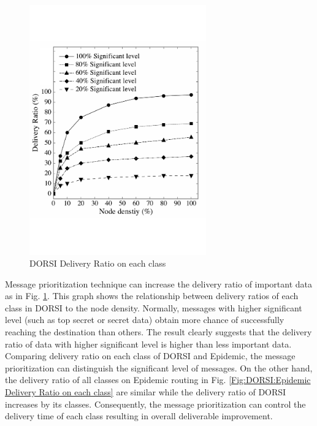 \begin{figure}[!h]
\centering
\includegraphics[width=3in]{Graphs/DR_NodeDenstiy2.pdf}
\caption{DORSI Delivery Ratio on each class}
\label{Fig:DORSI:DORSI Delivery Ratio on each class}
\end{figure}

Message prioritization technique can increase the delivery ratio of important data as in Fig. \ref{Fig:DORSI:DORSI Delivery Ratio on each class}. 
This graph shows the relationship between delivery ratios of each class in DORSI to the node density. 
Normally, messages with higher significant level (such as top secret or secret data) obtain more chance of successfully reaching the destination than others. The result clearly suggests that the delivery ratio of data with higher significant level is higher than less important data. 
Comparing delivery ratio on each class of DORSI and Epidemic, the message prioritization can distinguish the significant level of messages. 
On the other hand, the delivery ratio of all classes on Epidemic routing in Fig. \ref{Fig:DORSI:Epidemic Delivery Ratio on each class} are similar while the delivery ratio of DORSI increases by its classes. 
Consequently, the message prioritization can control the delivery time of each class resulting in overall deliverable improvement.

